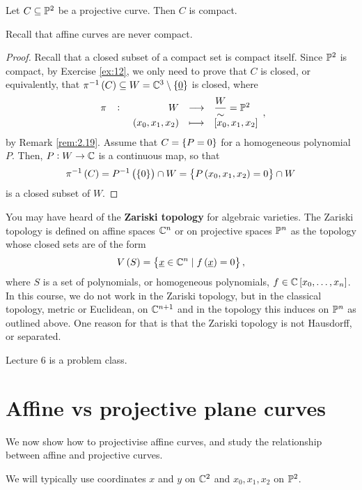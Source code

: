 \begin{lemma}
Let $ C \subseteq \P^2 $ be a projective curve. Then $ C $ is compact.
\end{lemma}

Recall that affine curves are never compact.

\begin{proof}
Recall that a closed subset of a compact set is compact itself. Since $ \P^2 $ is compact, by Exercise \ref{ex:12}, we only need to prove that $ C $ is closed, or equivalently, that $ \pi^{-1}\br{C} \subseteq W = \C^3 \setminus \cbr{\underline{0}} $ is closed, where
$$ \function[\pi]{W}{\dfrac{W}{\sim} = \P^2}{\br{x_0, x_1, x_2}}{\sbr{x_0, x_1, x_2}}, $$
by Remark \ref{rem:2.19}. Assume that $ C = \cbr{P = 0} $ for a homogeneous polynomial $ P $. Then, $ P : W \to \C $ is a continuous map, so that
$$ \pi^{-1}\br{C} = P^{-1}\br{\cbr{0}} \cap W = \cbr{P\br{x_0, x_1, x_2} = 0} \cap W $$
is a closed subset of $ W $.
\end{proof}

\begin{remark}
You may have heard of the \textbf{Zariski topology} for algebraic varieties. The Zariski topology is defined on affine spaces $ \C^n $ or on projective spaces $ \P^n $ as the topology whose closed sets are of the form
$$ V\br{S} = \cbr{\underline{x} \in \C^n \mid f\br{\underline{x}} = 0}, $$
where $ S $ is a set of polynomials, or homogeneous polynomials, $ f \in \C\sbr{x_0, \dots, x_n} $. In this course, we do not work in the Zariski topology, but in the classical topology, metric or Euclidean, on $ \C^{n + 1} $ and in the topology this induces on $ \P^n $ as outlined above. One reason for that is that the Zariski topology is not Hausdorff, or separated.
\end{remark}


Lecture 6 is a problem class.

\pagebreak

\section{Affine vs projective plane curves}

We now show how to projectivise affine curves, and study the relationship between affine and projective curves.

\begin{notation}
We will typically use coordinates $ x $ and $ y $ on $ \C^2 $ and $ x_0, x_1, x_2 $ on $ \P^2 $.
\end{notation}

